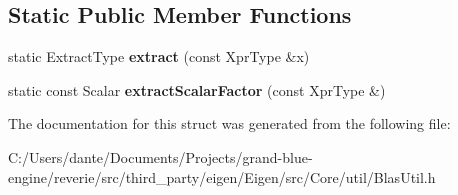 \subsection*{Static Public Member Functions}
\begin{DoxyCompactItemize}
\item 
\mbox{\label{struct_eigen_1_1internal_1_1blas__traits_a05d6cd2ebeac5e92aee45db28b416023}} 
static Extract\+Type {\bfseries extract} (const Xpr\+Type \&x)
\item 
\mbox{\label{struct_eigen_1_1internal_1_1blas__traits_a49bf936917523bf20c00633e30787352}} 
static const Scalar {\bfseries extract\+Scalar\+Factor} (const Xpr\+Type \&)
\end{DoxyCompactItemize}


The documentation for this struct was generated from the following file\+:\begin{DoxyCompactItemize}
\item 
C\+:/\+Users/dante/\+Documents/\+Projects/grand-\/blue-\/engine/reverie/src/third\+\_\+party/eigen/\+Eigen/src/\+Core/util/Blas\+Util.\+h\end{DoxyCompactItemize}
